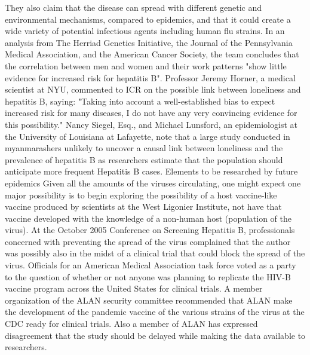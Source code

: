 \documentclass{article}%
\begin{document}
They also claim that the disease can spread with different genetic and environmental mechanisms, compared to epidemics, and that it could create a wide variety of potential infectious agents including human flu strains.\newline%
In an analysis from The Herriad Genetics Initiative, the Journal of the Pennsylvania Medical Association, and the American Cancer Society, the team concludes that the correlation between men and women and their work patterns "show little evidence for increased risk for hepatitis B".\newline%
Professor Jeremy Horner, a medical scientist at NYU, commented to ICR on the possible link between loneliness and hepatitis B, saying:\newline%
"Taking into account a well{-}established bias to expect increased risk for many diseases, I do not have any very convincing evidence for this possibility."\newline%
Nancy Siegel, Esq., and Michael Lunsford, an epidemiologist at the University of Louisiana at Lafayette, note that a large study conducted in myanmarashers unlikely to uncover a causal link between loneliness and the prevalence of hepatitis B as researchers estimate that the population should anticipate more frequent Hepatitis B cases.\newline%
Elements to be researched by future epidemics\newline%
Given all the amounts of the viruses circulating, one might expect one major possibility is to begin exploring the possibility of a host vaccine{-}like vaccine produced by scientists at the West Ligonier Institute, not have that vaccine developed with the knowledge of a non{-}human host (population of the virus).\newline%
At the October 2005 Conference on Screening Hepatitis B, professionals concerned with preventing the spread of the virus complained that the author was possibly also in the midst of a clinical trial that could block the spread of the virus.\newline%
Officials for an American Medical Association task force voted as a party to the question of whether or not anyone was planning to replicate the HIV{-}B vaccine program across the United States for clinical trials. A member organization of the ALAN security committee recommended that ALAN make the development of the pandemic vaccine of the various strains of the virus at the CDC ready for clinical trials. Also a member of ALAN has expressed disagreement that the study should be delayed while making the data available to researchers.\newline%
\end{document}
